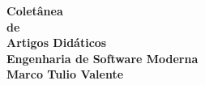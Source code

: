 \thispagestyle{empty}

\newpage
\thispagestyle{empty}
\vspace*{3cm}
\begin{center}
{\Huge \bf  Coletânea}\\
\vspace*{0.6cm}
{\Huge \bf de}\\
\vspace*{0.6cm}
{\Huge \bf Artigos Didáticos}\\ 
\vspace*{1.2cm}
{\Large \bf Engenharia de Software Moderna}\\ 
\vspace*{3cm}
{\Large \bf Marco Tulio Valente}
\end{center}
\newpage

\newpage

\tableofcontents
